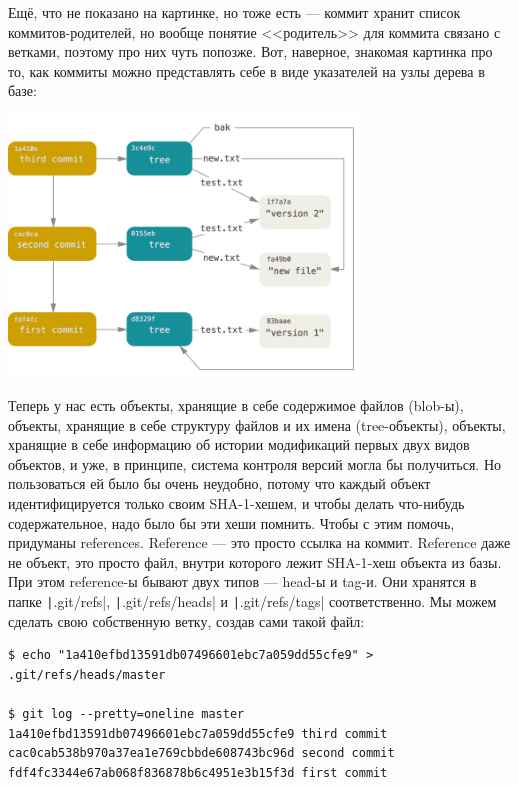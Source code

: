 \documentclass[a5paper]{article}
\begin{document}
Ещё, что не показано на картинке, но тоже есть --- коммит хранит список коммитов-родителей, но вообще понятие <<родитель>> для коммита связано с ветками, поэтому про них чуть попозже. Вот, наверное, знакомая картинка про то, как коммиты можно представлять себе в виде указателей на узлы дерева в базе:

\begin{center}
	\includegraphics[width=0.7\textwidth]{gitCommitObjects.png}
\end{center}

Теперь у нас есть объекты, хранящие в себе содержимое файлов (blob-ы), объекты, хранящие в себе структуру файлов и их имена (tree-объекты), объекты, хранящие в себе информацию об истории модификаций первых двух видов объектов, и уже, в принципе, система контроля версий могла бы получиться. Но пользоваться ей было бы очень неудобно, потому что каждый объект идентифицируется только своим SHA-1-хешем, и чтобы делать что-нибудь содержательное, надо было бы эти хеши помнить. Чтобы с этим помочь, придуманы references. Reference --- это просто ссылка на коммит. Reference даже не объект, это просто файл, внутри которого лежит SHA-1-хеш объекта из базы. При этом reference-ы бывают двух типов --- head-ы и tag-и. Они хранятся в папке \texttt|.git/refs|, \texttt|.git/refs/heads| и \texttt|.git/refs/tags| соответственно. Мы можем сделать свою собственную ветку, создав сами такой файл:

\begin{verbatim}
$ echo "1a410efbd13591db07496601ebc7a059dd55cfe9" > .git/refs/heads/master

$ git log --pretty=oneline master
1a410efbd13591db07496601ebc7a059dd55cfe9 third commit
cac0cab538b970a37ea1e769cbbde608743bc96d second commit
fdf4fc3344e67ab068f836878b6c4951e3b15f3d first commit
\end{verbatim}
\end{document}

